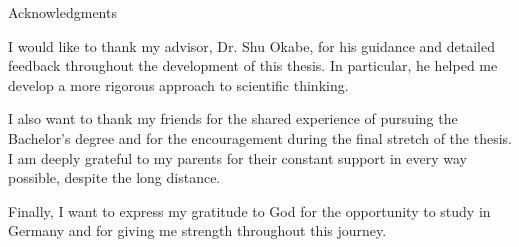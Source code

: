\thispagestyle{empty}

\vspace*{20mm}

\begin{center}
    { Acknowledgments}
\end{center}

\vspace{10mm}

I would like to thank my advisor, Dr. Shu Okabe, for his guidance and detailed feedback throughout the development of this thesis. In particular, he helped me develop a more rigorous approach to scientific thinking.

I also want to thank my friends for the shared experience of pursuing the Bachelor's degree and for the encouragement during the final stretch of the thesis. I am deeply grateful to my parents for their constant support in every way possible, despite the long distance.

Finally, I want to express my gratitude to God for the opportunity to study in Germany and for giving me strength throughout this journey.

\cleardoublepage{}
